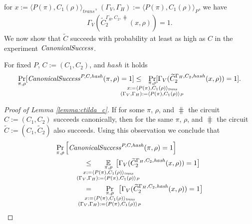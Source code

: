for $x := \langle P(\pi), C_1(\rho) \rangle_{\mathit{trans}}$, $(\Gamma_V, \Gamma_H) := \langle P(\pi), C_1(\rho) \rangle_{P}$, we have
\begin{align*}
  \Gamma_V(\widetilde{C}_2^{\Gamma_H, C_2, \hash}(x, \rho)) = 1.
\end{align*}
We now show that $\widetilde{C}$ succeeds with probability at least as high as $C$ in the experiment $\operatorname{\mathit{CanonicalSuccess}}$.
%
\begin{lemma}
  \label{lemma:ctilda_c}
  For fixed $P$, $C := (C_1, C_2)$, and $hash$ it holds
  \begin{align*}
    \underset{\pi, \rho}{\Pr}[\CanonicalSuccess^{P, C, \hash}(\pi, \rho) = 1]
    \leq
    \mkern13mu
    \underset{
      \mathclap{
      \substack{
        \pi, \rho \\
        x := \langle P(\pi), C_1(\rho) \rangle_{\mathit{trans}} \\
        (\Gamma_V, \Gamma_H) := \langle P(\pi), C_1(\rho) \rangle_{P}}}}
  {\Pr}[\Gamma_V(\widetilde{C}_2^{\Gamma_H, C_2, hash}(x, \rho)) = 1].
  \end{align*}
\end{lemma}
%
\begin{proof}[Proof of Lemma \ref{lemma:ctilda_c}]
If for some $\pi$, $\rho$, and $\hash$ the circuit $C := (C_1, C_2)$ succeeds canonically,
then for the same $\pi$, $\rho$, and $\hash$ the circuit $\widetilde{C} := (C_1, \widetilde{C}_2)$ also succeeds.
Using this observation we conclude that
\begin{align*}
  &\underset{\pi, \rho}{\Pr}\left[\CanonicalSuccess^{P, C, \hash}(\pi, \rho) = 1\right] \\
  &\IndII \leq
  \mkern33mu
    \underset{
      \mathclap{
        \substack{\pi, \rho \\
        x := \langle P(\pi), C_1(\rho) \rangle_{\mathit{trans}} \\
        (\Gamma_V, \Gamma_H) := \langle P(\pi), C_1(\rho) \rangle_{P}
      }}}
    {\mathbb{E}}\mkern13mu\big[\Gamma_V(\widetilde{C}_2^{\Gamma_H, C_2, \hash}(x, \rho)) = 1\big] \\
  &\IndII =
  \mkern33mu
    \underset{
      \mathclap{
        \substack{\pi, \rho \\
        x := \langle P(\pi), C_1(\rho) \rangle_{\mathit{trans}} \\
        (\Gamma_V, \Gamma_H) := \langle P(\pi), C_1(\rho) \rangle_{P}
      }}}
    {\Pr}\mkern13mu\big[\Gamma_V(\widetilde{C}_2^{\Gamma_H, C_2, \hash}(x, \rho)) = 1\big]
\end{align*}
\end{proof}

